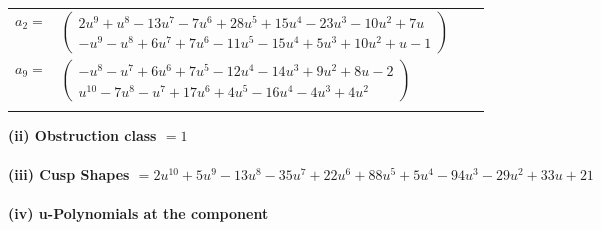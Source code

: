 \documentclass[1p]{elsarticle_modified}
\theoremstyle{definition}
\begin{document}
\begin{tabular}{m{7pt} m{180pt} m{7pt} m{180pt} }
\flushright $a_{2}=$&$\begin{pmatrix}2 u^9+u^8-13 u^7-7 u^6+28 u^5+15 u^4-23 u^3-10 u^2+7 u\\- u^9- u^8+6 u^7+7 u^6-11 u^5-15 u^4+5 u^3+10 u^2+u-1\end{pmatrix}$ \\
\flushright $a_{9}=$&$\begin{pmatrix}- u^8- u^7+6 u^6+7 u^5-12 u^4-14 u^3+9 u^2+8 u-2\\u^{10}-7 u^8- u^7+17 u^6+4 u^5-16 u^4-4 u^3+4 u^2\end{pmatrix}$\\&\end{tabular}
\flushleft \textbf{(ii) Obstruction class $= 1$}\\~\\
\flushleft \textbf{(iii) Cusp Shapes $= 2 u^{10}+5 u^9-13 u^8-35 u^7+22 u^6+88 u^5+5 u^4-94 u^3-29 u^2+33 u+21$}\\~\\
\newpage\renewcommand{\arraystretch}{1}
\flushleft \textbf{(iv) u-Polynomials at the component}\newline \\
\end{document}
